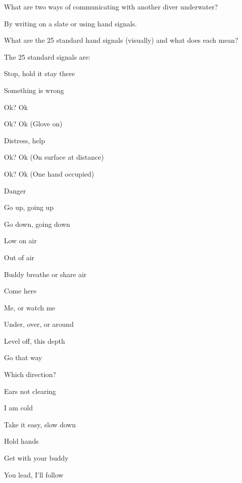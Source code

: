 	\begin{qanda}
		\begin{question}
What are two ways of communicating with another diver underwater?
		\end{question}

		\begin{answer}
By writing on a slate or using hand signals.
		\end{answer}
	\end{qanda}

	\begin{qanda}
		\begin{question}
What are the 25 standard hand signals (visually) and what does each mean?
		\end{question}

		\begin{answer}
The 25 standard signals are:
			\begin{nospacenumberedlist}
				\item Stop, hold it stay there
				\item Something is wrong
				\item Ok?  Ok
				\item Ok?  Ok  (Glove on)
				\item Distress, help
				\item Ok?  Ok (On surface at distance)
				\item Ok?  Ok  (One hand occupied)
				\item Danger
				\item Go up, going up
				\item Go down, going down
				\item Low on air
				\item Out of air
				\item Buddy breathe or share air
				\item Come here
				\item Me, or watch me
				\item Under, over, or around
				\item Level off, this depth
				\item Go that way
				\item Which direction?
				\item Ears not clearing
				\item I am cold
				\item Take it easy, slow down
				\item Hold hands
				\item Get with your buddy
				\item You lead, I'll follow
			\end{nospacenumberedlist}
		\end{answer}
	\end{qanda}

